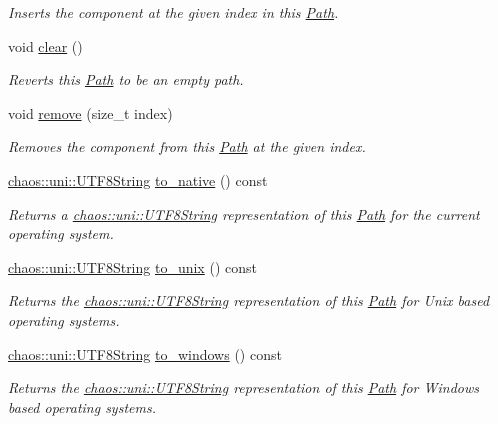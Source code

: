 \begin{DoxyCompactItemize}
\begin{DoxyCompactList}\small\item\em Inserts the component at the given index in this \hyperlink{classchaos_1_1io_1_1sys_1_1_path}{Path}. \end{DoxyCompactList}\item 
void \hyperlink{classchaos_1_1io_1_1sys_1_1_path_a7c4cd7e5d8e21a8c522f8a87f1e90f4c}{clear} ()
\begin{DoxyCompactList}\small\item\em Reverts this \hyperlink{classchaos_1_1io_1_1sys_1_1_path}{Path} to be an empty path. \end{DoxyCompactList}\item 
void \hyperlink{classchaos_1_1io_1_1sys_1_1_path_aefc69b11820209acca278104fb230832}{remove} (size\-\_\-t index)
\begin{DoxyCompactList}\small\item\em Removes the component from this \hyperlink{classchaos_1_1io_1_1sys_1_1_path}{Path} at the given index. \end{DoxyCompactList}\item 
\hyperlink{classchaos_1_1uni_1_1_u_t_f8_string}{chaos\-::uni\-::\-U\-T\-F8\-String} \hyperlink{classchaos_1_1io_1_1sys_1_1_path_adb68b7589d18dc78f19d9dd6936d9833}{to\-\_\-native} () const 
\begin{DoxyCompactList}\small\item\em Returns a \hyperlink{classchaos_1_1uni_1_1_u_t_f8_string}{chaos\-::uni\-::\-U\-T\-F8\-String} representation of this \hyperlink{classchaos_1_1io_1_1sys_1_1_path}{Path} for the current operating system. \end{DoxyCompactList}\item 
\hyperlink{classchaos_1_1uni_1_1_u_t_f8_string}{chaos\-::uni\-::\-U\-T\-F8\-String} \hyperlink{classchaos_1_1io_1_1sys_1_1_path_a1cfe95a7a81ba7da856ae79917e6b1bf}{to\-\_\-unix} () const 
\begin{DoxyCompactList}\small\item\em Returns the \hyperlink{classchaos_1_1uni_1_1_u_t_f8_string}{chaos\-::uni\-::\-U\-T\-F8\-String} representation of this \hyperlink{classchaos_1_1io_1_1sys_1_1_path}{Path} for Unix based operating systems. \end{DoxyCompactList}\item 
\hyperlink{classchaos_1_1uni_1_1_u_t_f8_string}{chaos\-::uni\-::\-U\-T\-F8\-String} \hyperlink{classchaos_1_1io_1_1sys_1_1_path_ad7b185968a88741d52526a32738d0ab4}{to\-\_\-windows} () const 
\begin{DoxyCompactList}\small\item\em Returns the \hyperlink{classchaos_1_1uni_1_1_u_t_f8_string}{chaos\-::uni\-::\-U\-T\-F8\-String} representation of this \hyperlink{classchaos_1_1io_1_1sys_1_1_path}{Path} for Windows based operating systems. \end{DoxyCompactList}\item 

\end{DoxyCompactItemize}
